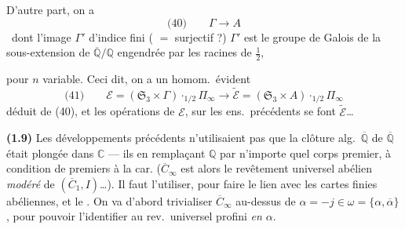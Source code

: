 \documentclass[11pt,a4paper]{article}
\begin{document}
D'autre part, on a
\[
  \text{(40)} \qquad \Gamma \longrightarrow A
\]
\ dont l'image $\Gamma'$  d'indice fini ( $=$ surjectif ?)  $\Gamma'$ est le groupe de Galois de la sous-extension de $\overline{\mathbb{Q}}/\mathbb{Q}$ engendrée par les racines  de $\tfrac12$,

pour $n$ variable. Ceci dit, on a un homom.\ évident
\[
  \text{(41)} \qquad \mathcal{E} = (\mathfrak{S}_3 \times \Gamma) \cdot_{1/2} \Pi_\infty \longrightarrow \widetilde{\mathcal{E}} = (\mathfrak{S}_3 \times A) \cdot_{1/2} \Pi_\infty
\]
déduit de (40), et les opérations de $\mathcal{E}$, sur les ens.\ précédents se font  $\widetilde{\mathcal{E}}$\ldots

\textbf{(1.9)} Les développements précédents n'utilisaient pas que  la clôture alg.\ $\overline{\mathbb{Q}}$  de $\overline{\mathbb{Q}}$ était plongée dans $\mathbb{C}$ --- ils  en remplaçant $\mathbb{Q}$ par n'importe quel corps premier, à condition de \ill{} \ill{} \ill{} premiers à la car. ($\overline{C}_\infty$ est alors le revêtement universel abélien \emph{modéré} de $(\overline{C}_1, I)$\ldots). Il faut l'utiliser, pour faire le lien avec les cartes  finies abéliennes, et le  . On va d'abord trivialiser $\overline{C}_\infty$ au-dessus de $\alpha = -j \in \omega = \{\alpha, \overline{\alpha}\}$, pour pouvoir l'identifier au rev.\ universel profini  \emph{en $\alpha$}.
\end{document}
